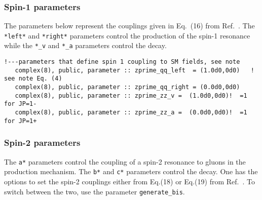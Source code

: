 \documentclass[aps,superscriptaddress,nofootinbib]{revtex4}
\begin{document}
\subsubsection{ Spin-1 parameters }

The parameters below represent the couplings given in Eq.~(16) from Ref.~\cite{Bolognesi:2012}. The \verb|*left*| and \verb|*right*| parameters control the production of the spin-1 resonance while the \verb|*_v| and \verb|*_a| parameters control the decay.

\begin{verbatim}
!---parameters that define spin 1 coupling to SM fields, see note
   complex(8), public, parameter :: zprime_qq_left  = (1.0d0,0d0)   !  see note Eq. (4)
   complex(8), public, parameter :: zprime_qq_right = (0.0d0,0d0)
   complex(8), public, parameter :: zprime_zz_v =  (1.0d0,0d0)!  =1 for JP=1-
   complex(8), public, parameter :: zprime_zz_a =  (0.0d0,0d0)!  =1 for JP=1+
\end{verbatim}

\subsubsection{ Spin-2 parameters }

\noindent
The \verb|a*| parameters control the coupling of a spin-2 resonance to gluons in the production mechanism.  The \verb|b*| and \verb|c*| parameters control the decay.
One has the options to set the spin-2 couplings either from Eq.(18) or Eq.(19) from Ref.~\cite{Bolognesi:2012}.  To switch between the two, use the parameter \verb|generate_bis|.
\end{document}
